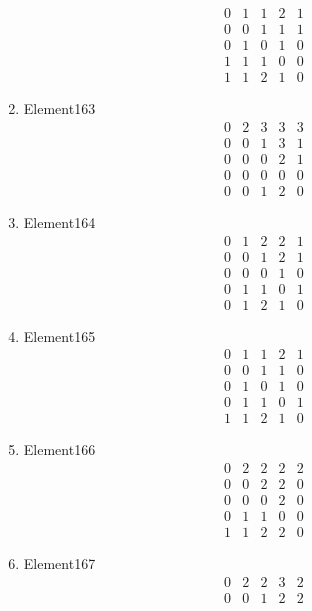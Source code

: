 \documentclass[12pt]{article}
\begin{document}
\begin{multicols}{3}
\begin{enumerate}
\begin{equation*}
\begin{array}{ccccc}
0&1&1&2&1\\
0&0&1&1&1\\
0&1&0&1&0\\
1&1&1&0&0\\
1&1&2&1&0
\end{array}
\end{equation*}
\item Element163
\begin{equation*}
\begin{array}{ccccc}
0&2&3&3&3\\
0&0&1&3&1\\
0&0&0&2&1\\
0&0&0&0&0\\
0&0&1&2&0
\end{array}
\end{equation*}
\item Element164
\begin{equation*}
\begin{array}{ccccc}
0&1&2&2&1\\
0&0&1&2&1\\
0&0&0&1&0\\
0&1&1&0&1\\
0&1&2&1&0
\end{array}
\end{equation*}
\item Element165
\begin{equation*}
\begin{array}{ccccc}
0&1&1&2&1\\
0&0&1&1&0\\
0&1&0&1&0\\
0&1&1&0&1\\
1&1&2&1&0
\end{array}
\end{equation*}
\item Element166
\begin{equation*}
\begin{array}{ccccc}
0&2&2&2&2\\
0&0&2&2&0\\
0&0&0&2&0\\
0&1&1&0&0\\
1&1&2&2&0
\end{array}
\end{equation*}
\item Element167
\begin{equation*}
\begin{array}{ccccc}
0&2&2&3&2\\
0&0&1&2&2\\

\end{array}
\end{equation*}
\end{enumerate}
\end{multicols}
\end{document}
